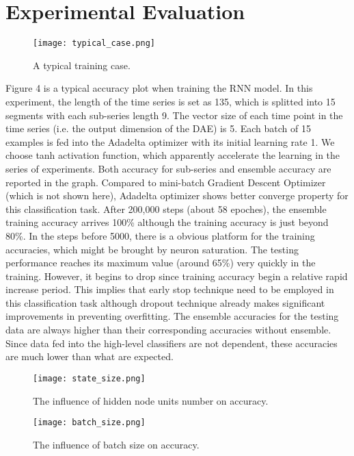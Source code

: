 
\section{Experimental Evaluation}
\begin{figure}[htb!]
    \centering
    \texttt{[image: typical\_case.png]}
    \caption{A typical training case.}
    \label{fig:awesome_image}
\end{figure}
\FloatBarrier
Figure 4 is a typical accuracy plot when training the RNN model. In this experiment, the length of the time series is set as 135, which is splitted into 15 segments with each sub-series length 9. The vector size of each time point in the time series (i.e. the output dimension of the DAE) is 5. Each batch of 15 examples is fed into the Adadelta optimizer with its initial learning rate 1. We choose tanh activation function, which apparently accelerate the learning in the series of experiments. Both accuracy for sub-series and ensemble accuracy are reported in the graph. Compared to mini-batch Gradient Descent Optimizer (which is not shown here), Adadelta optimizer shows better converge property for this classification task.  After 200,000 steps (about 58 epoches), the ensemble training accuracy arrives 100\% although the training accuracy is just beyond 80\%. In the steps before 5000, there is a obvious platform for the training accuracies, which might be brought by neuron saturation. The testing performance reaches its maximum value  (around 65\%) very quickly in the training. However, it begins to drop since training accuracy begin a relative rapid increase period. This implies that early stop technique need to be employed in this classification task although dropout technique already makes significant improvements in preventing overfitting. The ensemble accuracies for the testing data are always higher than their corresponding accuracies without ensemble. Since data fed into the high-level classifiers are not dependent, these accuracies are much lower than what are expected.



\begin{figure}[!htbp]
    \centering
    \texttt{[image: state\_size.png]}
    \caption{The influence of hidden node units number on accuracy.}
    \label{fig:awesome_image}
\end{figure}

\begin{figure}[!htbp]
    \centering
    \texttt{[image: batch\_size.png]}
    \caption{The influence of batch size on accuracy.}
    \label{fig:awesome_image}
\end{figure}


